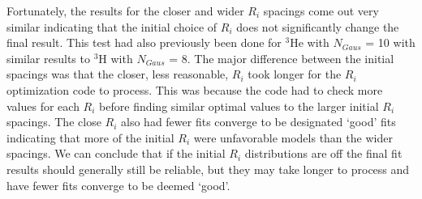 Fortunately, the results for the closer and wider $R_i$ spacings come out very similar indicating that the initial choice of $R_i$ does not significantly change the final result. This test had also previously been done for $^3$He with $N_{Gaus}$ = 10 with similar results to $^3$H with $N_{Gaus}$ = 8. The major difference between the initial spacings was that the closer, less reasonable, $R_i$ took longer for the $R_i$ optimization code to process. This was because the code had to check more values for each $R_i$ before finding similar optimal values to the larger initial $R_i$ spacings. The close $R_i$ also had fewer fits converge to be designated `good' fits indicating that more of the initial $R_i$ were unfavorable models than the wider spacings. We can conclude that if the initial $R_i$ distributions are off the final fit results should generally still be reliable, but they may take longer to process and have fewer fits converge to be deemed `good'.  


